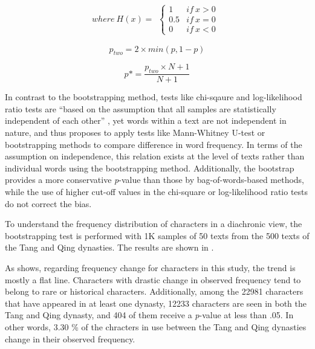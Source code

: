 \begin{equation*}
    where\: H(x) =
        \begin{aligned}\begin{cases}
            1 & if\: x > 0 \\
            0.5 & if\: x = 0 \\
            0 & if \: x < 0
        \end{cases}\end{aligned}
\end{equation*}

\begin{equation}
    p_{two} = 2 \times min(p, 1-p)
\end{equation}

\begin{equation}
    p\ast = \frac{p_{two} \times N + 1}{N + 1}
\end{equation}

In contrast to the bootstrapping method, tests like chi-sqaure and log-likelihood ratio tests are ``based on the assumption that all samples are statistically independent of each other'' \parencite{lijffijt2016bootstrap}, yet words within a text are not independent in nature, and thus \textcite{lijffijt2016bootstrap} proposes to apply tests like Mann-Whitney U-test or bootstrapping methods to compare difference in word frequency. In terms of the assumption on independence, this relation exists at the level of texts rather than individual words using the bootstrapping method. Additionally, the bootstrap provides a more conservative \textit{p}-value than those by bag-of-words-based methods, while the use of higher cut-off values in the chi-square or log-likelihood ratio tests do not correct the bias.

To understand the frequency distribution of characters in a diachronic view, the bootstrapping test is performed with 1K samples of 50 texts from the 500 texts of the Tang and Qing dynasties. The results are shown in .

As  shows, regarding frequency change for characters in this study, the trend is mostly a flat line. Characters with drastic change in observed frequency tend to belong to rare or historical characters. Additionally, among the \num{22981} characters that have appeared in at least one dynasty, \num{12233} characters are seen in both the Tang and Qing dynasty, and \num{404} of them receive a \textit{p}-value at less than .05. In other words, 3.30 \% of the chracters in use between the Tang and Qing dynasties change in their observed frequency.


